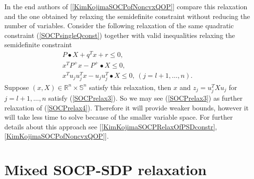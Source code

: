 \documentclass[12pt]{book}
\theoremstyle{definition}
\begin{document}
In the end authors of [\ref{KimKojimaSOCPofNoncvxQOP}] compare this relaxation and the one obtained by relaxing the semidefinite constraint without reducing the number of variables.  Consider the following relaxation of the same quadratic constraint (\ref{SOCPsingleQconst})
together with valid inequalities relaxing the semidefinite constraint
\begin{equation}
\begin{array}{l}
\label{SOCPrelax4}
P\bullet X + q^Tx + r \leq 0,\\
x^TP^+x - P^+\bullet X \leq 0, \\
x^Tu_ju_j^Tx - u_ju_j^T\bullet X \leq 0, \ (j = l+1,\dots ,n).
\end{array}
\end{equation}
Suppose $(x,X) \in \mathbb{R}^n\times \mathbb{S}^n$ satisfy this relaxation, then $x$ and $z_j = u_j^TXu_j$ for $j = l+1,\dots ,n$ satisfy (\ref{SOCPrelax3}). So we may see (\ref{SOCPrelax3}) as further relaxation of (\ref{SOCPrelax4}).
Therefore it will provide weaker bounds, however it will take less time to solve because of the smaller variable space.  
For further details about this approach see  [\ref{KimKojimaSOCPRelaxOfPSDconstr}, \ref{KimKojimaSOCPofNoncvxQOP}].



\section{Mixed SOCP-SDP relaxation}
\end{document}
